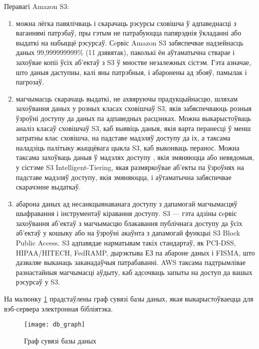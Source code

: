 Перавагі Amazon S3:
\begin{enumerate}
    \item можна лёгка павялічваць і скарачаць рэсурсы сховішча ў адпаведнасці з ваганнямі патрэбаў, пры гэтым не патрабуюцца папярэднія ўкладанні або выдаткі на набыццё рэсурсаў. Сeрвіс Amazon S3 забяспечвае надзейнасць даных 99,999999999\% (11 дзявятак), паколькі ён аўтаматычна стварае і захоўвае копіі ўсіх аб'ектаў з S3 ў мностве незалежных сістэм. Гэта азначае, што даныя даступны, калі яны патрэбныя, і абаронены ад збояў, памылак і пагрозаў.
    \item магчымасць скарачаць выдаткі, не ахвяруючы прадукцыйнасцю, шляхам захоўвання даных у розных класах сховішчаў S3, якія забяспечваюць розныя ўзроўні доступу да даных па адпаведных расцэнках. Можна выкарыстоўваць аналіз класаў сховішчаў S3, каб выявіць даныя, якія варта перанесці ў менш затратны клас сховішча, на падставе мадэляў доступу да іх, а таксама наладзіць палітыку жыццёвага цыкла S3, каб выконваць перанос. Можна таксама захоўваць даныя ў мадэлях доступу , якія змяняюцца або невядомыя, у сістэме S3 Intelligent-Tiering, якая размяркоўвае аб'екты па ўзроўнях на падставе мадэляў доступу, якія змяняюцца, і аўтаматычна забяспечвае скарачэнне выдаткаў.
    \item абарона даных ад несанкцыянаванага доступу з дапамогай магчымасцяў шыфравання і інструментаў кіравання доступу. S3 --- гэта адзіны сeрвіс захоўвання аб'ектаў з магчымасцю блакавання публічнага доступу да ўсіх аб'ектаў у кошыку або на ўзроўні акаўнта з дапамогай функцыі S3 Block Public Access. S3 адпавядае нарматывам такіх стандартаў, як PCI-DSS, HIPAA/HITECH, FedRAMP, дырэктыва ЕЗ па абароне даных і FISMA, што дазваляе выканаць заканадаўчыя патрабаванні. AWS таксама падтрымлівае разнастайныя магчымасці аўдыту, каб адсочваць запыты на доступ да вашых рэсурсаў у S3.
\end{enumerate}

На малюнку \ref{img: DB graph} прадстаўлены граф сувязі базы даных, якая выкарыстоўваецца для вэб-сервера электронная бібліятэка.

\newpage

\begin{figure}[h!]
    \centering
    \texttt{[image: db\_graph]}
    \caption{Граф сувязі базы даных}
    \label{img: DB graph} 
\end{figure}

